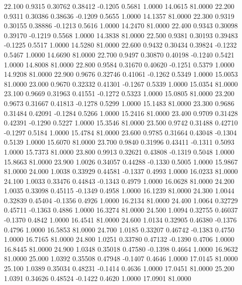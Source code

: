   22.100   0.9315   0.30762   0.38412  -0.1205   0.5681   1.0000  14.0615  81.0000
  22.200   0.9311   0.30386   0.38636  -0.1209   0.5655   1.0000  14.1357  81.0000
  22.300   0.9319   0.30155   0.38886  -0.1213   0.5616   1.0000  14.2470  81.0000
  22.400   0.9343   0.30098   0.39170  -0.1219   0.5568   1.0000  14.3838  81.0000
  22.500   0.9381   0.30193   0.39483  -0.1225   0.5517   1.0000  14.5280  81.0000
  22.600   0.9432   0.30434   0.39824  -0.1232   0.5467   1.0000  14.6690  81.0000
  22.700   0.9497   0.30870   0.40198  -0.1240   0.5421   1.0000  14.8008  81.0000
  22.800   0.9584   0.31670   0.40620  -0.1251   0.5379   1.0000  14.9208  81.0000
  22.900   0.9676   0.32746   0.41061  -0.1262   0.5349   1.0000  15.0053  81.0000
  23.000   0.9670   0.32332   0.41301  -0.1267   0.5339   1.0000  15.0354  81.0000
  23.100   0.9669   0.31963   0.41551  -0.1272   0.5323   1.0000  15.0805  81.0000
  23.200   0.9673   0.31667   0.41813  -0.1278   0.5299   1.0000  15.1483  81.0000
  23.300   0.9686   0.31484   0.42091  -0.1284   0.5266   1.0000  15.2416  81.0000
  23.400   0.9709   0.31428   0.42391  -0.1290   0.5227   1.0000  15.3546  81.0000
  23.500   0.9742   0.31488   0.42710  -0.1297   0.5184   1.0000  15.4784  81.0000
  23.600   0.9785   0.31664   0.43048  -0.1304   0.5139   1.0000  15.6070  81.0000
  23.700   0.9840   0.31996   0.43411  -0.1311   0.5093   1.0000  15.7373  81.0000
  23.800   0.9913   0.32621   0.43808  -0.1319   0.5048   1.0000  15.8663  81.0000
  23.900   1.0026   0.34057   0.44288  -0.1330   0.5005   1.0000  15.9867  81.0000
  24.000   1.0038   0.33929   0.44581  -0.1337   0.4993   1.0000  16.0233  81.0000
  24.100   1.0033   0.33476   0.44843  -0.1343   0.4979   1.0000  16.0628  81.0000
  24.200   1.0035   0.33098   0.45115  -0.1349   0.4958   1.0000  16.1239  81.0000
  24.300   1.0044   0.32839   0.45404  -0.1356   0.4926   1.0000  16.2134  81.0000
  24.400   1.0064   0.32729   0.45711  -0.1363   0.4886   1.0000  16.3274  81.0000
  24.500   1.0094   0.32755   0.46037  -0.1370   0.4842   1.0000  16.4541  81.0000
  24.600   1.0134   0.32905   0.46380  -0.1376   0.4796   1.0000  16.5853  81.0000
  24.700   1.0185   0.33207   0.46742  -0.1383   0.4750   1.0000  16.7165  81.0000
  24.800   1.0251   0.33780   0.47132  -0.1390   0.4706   1.0000  16.8445  81.0000
  24.900   1.0348   0.35018   0.47580  -0.1398   0.4664   1.0000  16.9632  81.0000
  25.000   1.0392   0.35508   0.47948  -0.1407   0.4646   1.0000  17.0145  81.0000
  25.100   1.0389   0.35034   0.48231  -0.1414   0.4636   1.0000  17.0451  81.0000
  25.200   1.0391   0.34626   0.48524  -0.1422   0.4620   1.0000  17.0901  81.0000
